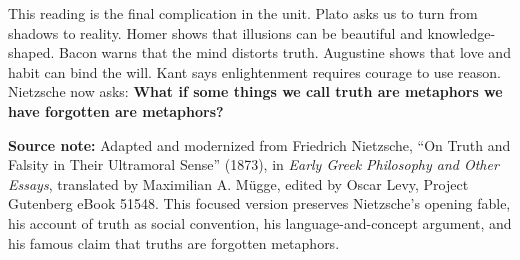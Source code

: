 \documentclass[12pt]{article}
\newcommand{\focusbox}[1]{%
\vspace{0.4em}\noindent\colorbox{gray!12}{\begin{minipage}{0.96\linewidth}#1\end{minipage}}\vspace{0.5em}}
\begin{document}
This reading is the final complication in the unit. Plato asks us to turn from shadows to reality. Homer shows that illusions can be beautiful and knowledge-shaped. Bacon warns that the mind distorts truth. Augustine shows that love and habit can bind the will. Kant says enlightenment requires courage to use reason. Nietzsche now asks: \textbf{What if some things we call truth are metaphors we have forgotten are metaphors?}

\focusbox{\textbf{Source note:} Adapted and modernized from Friedrich Nietzsche, ``On Truth and Falsity in Their Ultramoral Sense'' (1873), in \textit{Early Greek Philosophy and Other Essays}, translated by Maximilian A. M\"ugge, edited by Oscar Levy, Project Gutenberg eBook 51548. This focused version preserves Nietzsche's opening fable, his account of truth as social convention, his language-and-concept argument, and his famous claim that truths are forgotten metaphors.}
\end{document}
